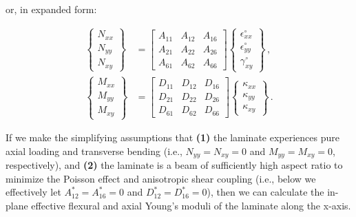 \documentclass[twocolumn, linenumbers, superscriptaddress, nofootinbib]{revtex4-1}
\begin{document}
				or, in expanded form:
				
				\begin{equation}
					\begin{aligned}
						\begin{Bmatrix}
							N_{xx} \\
							N_{yy} \\
							N_{xy}
						\end{Bmatrix}
						& =
						\begin{bmatrix}
							A_{11} & A_{12} & A_{16} \\
							A_{21} & A_{22} & A_{26} \\
							A_{61} & A_{62} & A_{66}
						\end{bmatrix}
						\begin{Bmatrix}
							\epsilon^{\circ}_{xx} \\
							\epsilon^{\circ}_{yy} \\
							\gamma^{\circ}_{xy}
						\end{Bmatrix}\,,
						\\
						\begin{Bmatrix}
							M_{xx} \\
							M_{yy} \\
							M_{xy}
						\end{Bmatrix}
						& =
						\begin{bmatrix}
							D_{11} & D_{12} & D_{16} \\
							D_{21} & D_{22} & D_{26} \\
							D_{61} & D_{62} & D_{66}
						\end{bmatrix}
						\begin{Bmatrix}
							\kappa_{xx} \\
							\kappa_{yy} \\
							\kappa_{xy}
						\end{Bmatrix}\,.
					\end{aligned}
				\end{equation}
				
				If we make the simplifying assumptions \cite{Jones2014, Reddy2004} that \textbf{(1)} the laminate experiences pure axial loading and transverse bending (i.e., $N_{yy} = N_{xy} = 0$ and $M_{yy} = M_{xy} = 0$, respectively), and \textbf{(2)} the laminate is a beam of sufficiently high aspect ratio to minimize the Poisson effect and anisotropic shear coupling (i.e., below we effectively let $A^*_{12} = A^*_{16} = 0$ and $D^*_{12} = D^*_{16} = 0$), then we can calculate the in-plane effective flexural and axial Young's moduli of the laminate along the x-axis.
				
\end{document}
